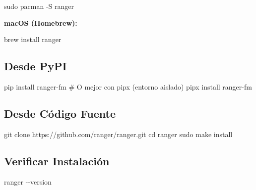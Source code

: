 \documentclass[
  doc,
  floatsintext,
  longtable,
  a4paper,
  nolmodern,
  notxfonts,
  notimes,
  12pt,
  colorlinks=true,linkcolor=blue,citecolor=blue,urlcolor=blue]{apa7}
\newenvironment{Shaded}{\begin{snugshade}}{\end{snugshade}}
\newcommand{\AttributeTok}[1]{\textcolor[rgb]{0.40,0.45,0.13}{#1}}
\newcommand{\BuiltInTok}[1]{\textcolor[rgb]{0.00,0.23,0.31}{#1}}
\newcommand{\CommentTok}[1]{\textcolor[rgb]{0.37,0.37,0.37}{#1}}
\newcommand{\ExtensionTok}[1]{\textcolor[rgb]{0.00,0.23,0.31}{#1}}
\newcommand{\FunctionTok}[1]{\textcolor[rgb]{0.28,0.35,0.67}{#1}}
\newcommand{\NormalTok}[1]{\textcolor[rgb]{0.00,0.23,0.31}{#1}}
\begin{document}
\begin{Shaded}
\begin{Highlighting}[]
\FunctionTok{sudo}\NormalTok{ pacman }\AttributeTok{{-}S}\NormalTok{ ranger}
\end{Highlighting}
\end{Shaded}

\textbf{macOS (Homebrew):}

\begin{Shaded}
\begin{Highlighting}[]
\ExtensionTok{brew}\NormalTok{ install ranger}
\end{Highlighting}
\end{Shaded}

\subsection{Desde PyPI}\label{desde-pypi}

\begin{Shaded}
\begin{Highlighting}[]
\ExtensionTok{pip}\NormalTok{ install ranger{-}fm}
\CommentTok{\# O mejor con pipx (entorno aislado)}
\ExtensionTok{pipx}\NormalTok{ install ranger{-}fm}
\end{Highlighting}
\end{Shaded}

\subsection{Desde Código Fuente}\label{desde-cuxf3digo-fuente}

\begin{Shaded}
\begin{Highlighting}[]
\FunctionTok{git}\NormalTok{ clone https://github.com/ranger/ranger.git}
\BuiltInTok{cd}\NormalTok{ ranger}
\FunctionTok{sudo}\NormalTok{ make install}
\end{Highlighting}
\end{Shaded}

\subsection{Verificar Instalación}\label{verificar-instalaciuxf3n}

\begin{Shaded}
\begin{Highlighting}[]
\ExtensionTok{ranger} \AttributeTok{{-}{-}version}
\end{Highlighting}
\end{Shaded}
\end{document}
